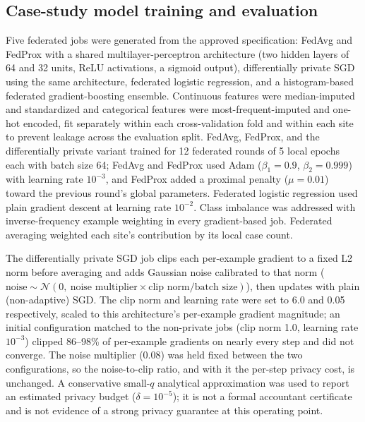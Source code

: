 \documentclass[preprint,5p, 10pt, times]{elsarticle}
\begin{document}
\subsection*{Case-study model training and evaluation}
\label{methods:casestudy}

Five federated jobs were generated from the approved specification: FedAvg and FedProx with a shared multilayer-perceptron architecture (two hidden layers of 64 and 32 units, ReLU activations, a sigmoid output), differentially private SGD using the same architecture, federated logistic regression, and a histogram-based federated gradient-boosting ensemble. Continuous features were median-imputed and standardized and categorical features were most-frequent-imputed and one-hot encoded, fit separately within each cross-validation fold and within each site to prevent leakage across the evaluation split. FedAvg, FedProx, and the differentially private variant trained for 12 federated rounds of 5 local epochs each with batch size 64; FedAvg and FedProx used Adam ($\beta_1=0.9$, $\beta_2=0.999$) with learning rate $10^{-3}$, and FedProx added a proximal penalty ($\mu=0.01$) toward the previous round's global parameters. Federated logistic regression used plain gradient descent at learning rate $10^{-2}$. Class imbalance was addressed with inverse-frequency example weighting in every gradient-based job. Federated averaging weighted each site's contribution by its local case count. 

The differentially private SGD job clips each per-example gradient to a fixed L2 norm before averaging and adds Gaussian noise calibrated to that norm ($\text{noise} \sim \mathcal{N}(0,\ \text{noise multiplier} \times \text{clip norm} / \text{batch size})$), then updates with plain (non-adaptive) SGD. The clip norm and learning rate were set to 6.0 and 0.05 respectively, scaled to this architecture's per-example gradient magnitude; an initial configuration matched to the non-private jobs (clip norm 1.0, learning rate $10^{-3}$) clipped 86--98\% of per-example gradients on nearly every step and did not converge. The noise multiplier (0.08) was held fixed between the two configurations, so the noise-to-clip ratio, and with it the per-step privacy cost, is unchanged. A conservative small-$q$ analytical approximation was used to report an estimated privacy budget ($\delta = 10^{-5}$); it is not a formal accountant certificate and is not evidence of a strong privacy guarantee at this operating point.
\end{document}
